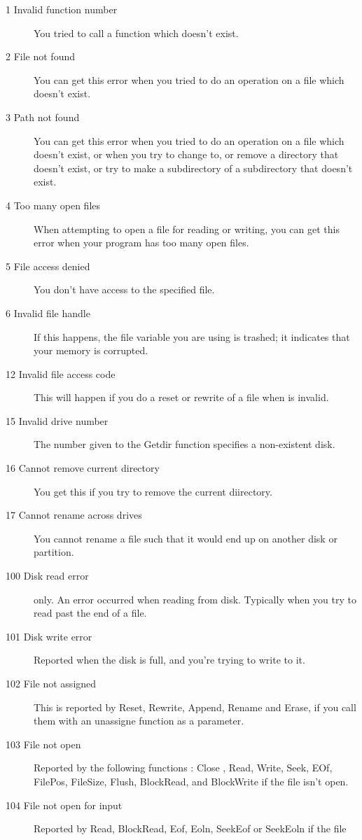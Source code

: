 \documentclass{report}
\begin{document}
\begin{description}
\item [1  Invalid function number]
You tried to call a \dos function which doesn't exist.
\item [2  File not found]
You can get this error when you tried to do an operation on a file which
doesn't exist.
\item [3  Path not found]
You can get this error when you tried to do an operation on a file which
doesn't exist, or when you try to change to, or remove a directory that doesn't exist,
or try to make a subdirectory  of a subdirectory that doesn't exist.
\item [4  Too many open files]
When attempting to open a file for reading or writing, you can get this
error when your program has too many open files.
\item [5  File access denied]
You don't have access to the specified file.
\item [6  Invalid file handle]
If this happens, the file variable you are using is trashed; it
indicates that your memory is corrupted.
\item [12  Invalid file access code]
This will happen if you do a reset or rewrite of a file when 
is invalid.
\item [15  Invalid drive number]
The number given to the Getdir function specifies a non-existent disk.
\item [16  Cannot remove current directory]
You get this if you try to remove the current diirectory.
\item [17  Cannot rename across drives]
You cannot rename a file such that it would end up on another disk or
partition.
\item [100  Disk read error]
\dos only. An error occurred when reading from disk. Typically when you try
to read past the end of a file.
\item [101  Disk write error]
Reported when the disk is full, and you're trying to write to it.
\item [102  File not assigned]
This is reported by Reset, Rewrite, Append, Rename and Erase, if you call
them with an unassigne function as a parameter.
\item [103  File not open]
Reported by the following functions : Close , Read, Write, Seek,
EOf, FilePos, FileSize, Flush, BlockRead, and BlockWrite if the file isn't
open.
\item [104  File not open for input]
Reported by Read, BlockRead, Eof, Eoln, SeekEof or SeekEoln if the file

\end{description}
\end{document}
